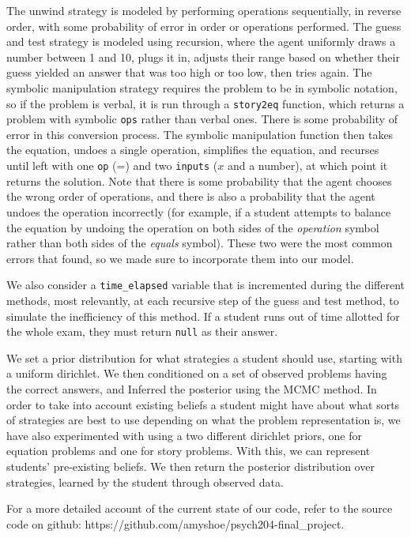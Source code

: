 \documentclass[10pt,letterpaper]{article}
\begin{document}
	The unwind strategy is modeled by performing operations sequentially, in reverse order, with some probability of error in order or operations performed. The guess and test strategy is modeled using recursion, where the agent uniformly draws a number between 1 and 10, plugs it in, adjusts their range based on whether their guess yielded an answer that was too high or too low, then tries again. The symbolic manipulation strategy requires the problem to be in symbolic notation, so if the problem is verbal, it is run through a \verb|story2eq| function, which returns a problem with symbolic \verb|ops| rather than verbal ones. There is some probability of error in this conversion process. The symbolic manipulation function then takes the equation, undoes a single operation, simplifies the equation, and recurses until left with one \verb|op| (=) and two \verb|inputs| ($x$ and a number), at which point it returns the solution. Note that there is some probability that the agent chooses the wrong order of operations, and there is also a probability that the agent undoes the operation incorrectly (for example, if a student attempts to balance the equation by undoing the operation on both sides of the \textit{operation} symbol rather than both sides of the \textit{equals} symbol). These two were the most common errors that  found, so we made sure to incorporate them into our model.
	
	We also consider a \verb|time_elapsed| variable that is incremented during the different methods, most relevantly, at each recursive step of the guess and test method, to simulate the inefficiency of this method. If a student runs out of time allotted for the whole exam, they must return \verb|null| as their answer.
	
	We set a prior distribution for what strategies a student should use, starting with a uniform dirichlet. We then conditioned on a set of observed problems having the correct answers, and Inferred the posterior using the MCMC method. In order to take into account existing beliefs a student might have about what sorts of strategies are best to use depending on what the problem representation is, we have also experimented with using a two different dirichlet priors, one for equation problems and one for story problems. With this, we can represent students' pre-existing beliefs. We then return the posterior distribution over strategies, learned by the student through observed data.
	
	For a more detailed account of the current state of our code, refer to the source code on github: https://github.com/amyshoe/psych204-final\_project.
	
\end{document}
